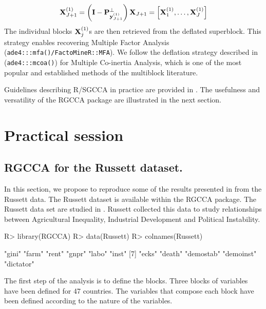 \documentclass[
]{jss}
\begin{document}
\[\mathbf{X}_{J+1}^{(1)} = \left(\mathbf{I} - \mathbf{P}^\perp_{\mathbf{y}_{J+1}^{(1)}} \right) \mathbf{X}_{J+1} = \left[ \mathbf{X}_1^{(1)}, \ldots, \mathbf{X}_J^{(1)} \right]\]
The individual blocks \(\mathbf{X}_j^{(1)}\)s are then retrieved from the
deflated superblock. This strategy enables recovering Multiple Factor
Analysis (\texttt{ade4:::mfa()/FactoMineR::MFA}). We follow the
deflation strategy described in \citep{Chessel1996}
(\texttt{ade4:::mcoa()}) for Multiple Co-inertia Analysis, which is one
of the most popular and established methods of the multiblock
literature.

Guidelines describing R/SGCCA in practice are provided in
\citep{Garali2018}. The usefulness and versatility of the RGCCA package
are illustrated in the next section.

\hypertarget{practical-session}{%
\section{Practical session}\label{practical-session}}

\hypertarget{rgcca-for-the-russett-dataset.}{%
\subsection{RGCCA for the Russett
dataset.}\label{rgcca-for-the-russett-dataset.}}

In this section, we propose to reproduce some of the results presented
in \citep{Tenenhaus2011} from the Russett data. The Russett dataset is
available within the RGCCA package. The Russett data set
\citep{Russett1964} are studied in \citep{Gifi1990}. Russett collected
this data to study relationships between Agricultural Inequality,
Industrial Development and Political Instability.

\footnotesize

\begin{CodeChunk}
\begin{CodeInput}
R> library(RGCCA)
R> data(Russett)
R> colnames(Russett)
\end{CodeInput}
\begin{CodeOutput}
 [1] "gini"     "farm"     "rent"     "gnpr"     "labo"     "inst"    
 [7] "ecks"     "death"    "demostab" "demoinst" "dictator"
\end{CodeOutput}
\end{CodeChunk}

\normalsize

The first step of the analysis is to define the blocks. Three blocks of
variables have been defined for 47 countries. The variables that compose
each block have been defined according to the nature of the variables.
\end{document}
